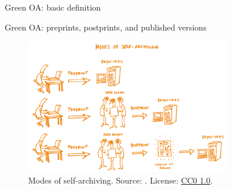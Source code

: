 \documentclass{beamer}
\begin{document}

\begin{frame}{Green OA: basic definition}
	\begin{itemize}
	\end{itemize}
\end{frame}


\begin{frame}{Green OA: preprints, postprints, and published versions}
\begin{figure}
\includegraphics[width=0.8\textwidth]{hb_1.png}
\caption{Modes of self-archiving. Source: \citet{bezjak_open_2018}. License: \href{https://creativecommons.org/publicdomain/zero/1.0/deed.en}{CC0 1.0}.}
\end{figure}
\end{frame}

\end{document}
